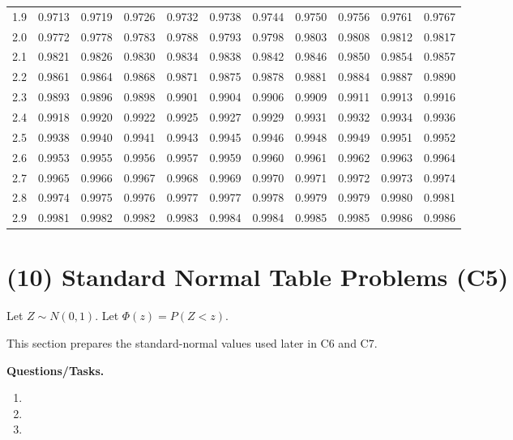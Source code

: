 \begin{center}
\begin{tabular}{c|cccccccccc}
			1.9 & 0.9713 & 0.9719 & 0.9726 & 0.9732 & 0.9738 & 0.9744 & 0.9750 & 0.9756 & 0.9761 & 0.9767\\
			2.0 & 0.9772 & 0.9778 & 0.9783 & 0.9788 & 0.9793 & 0.9798 & 0.9803 & 0.9808 & 0.9812 & 0.9817\\
			2.1 & 0.9821 & 0.9826 & 0.9830 & 0.9834 & 0.9838 & 0.9842 & 0.9846 & 0.9850 & 0.9854 & 0.9857\\
			2.2 & 0.9861 & 0.9864 & 0.9868 & 0.9871 & 0.9875 & 0.9878 & 0.9881 & 0.9884 & 0.9887 & 0.9890\\
			2.3 & 0.9893 & 0.9896 & 0.9898 & 0.9901 & 0.9904 & 0.9906 & 0.9909 & 0.9911 & 0.9913 & 0.9916\\
			2.4 & 0.9918 & 0.9920 & 0.9922 & 0.9925 & 0.9927 & 0.9929 & 0.9931 & 0.9932 & 0.9934 & 0.9936\\
			2.5 & 0.9938 & 0.9940 & 0.9941 & 0.9943 & 0.9945 & 0.9946 & 0.9948 & 0.9949 & 0.9951 & 0.9952\\
			2.6 & 0.9953 & 0.9955 & 0.9956 & 0.9957 & 0.9959 & 0.9960 & 0.9961 & 0.9962 & 0.9963 & 0.9964\\
			2.7 & 0.9965 & 0.9966 & 0.9967 & 0.9968 & 0.9969 & 0.9970 & 0.9971 & 0.9972 & 0.9973 & 0.9974\\
			2.8 & 0.9974 & 0.9975 & 0.9976 & 0.9977 & 0.9977 & 0.9978 & 0.9979 & 0.9979 & 0.9980 & 0.9981\\
			2.9 & 0.9981 & 0.9982 & 0.9982 & 0.9983 & 0.9984 & 0.9984 & 0.9985 & 0.9985 & 0.9986 & 0.9986
		\end{tabular}
	\end{center}
	
	\section{(10) Standard Normal Table Problems (C5)}
	\label{sec:standard-normal-table-problems-c5}
	
	Let \(Z\sim N(0,1)\). Let \(\Phi(z)=P(Z<z)\).
	
	This section prepares the standard-normal values used later in C6 and C7.
	
	\textbf{Questions/Tasks.}
	\begin{enumerate}[label=\textbf{\alph*)}]
		\item {}
		\item {}
		\item {}
	\end{enumerate}
	
